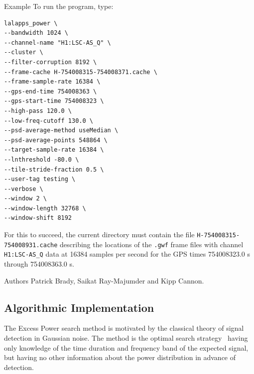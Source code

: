 \begin{entry}
\item[Example]
To run the program, type:
\begin{verbatim}
lalapps_power \
--bandwidth 1024 \
--channel-name "H1:LSC-AS_Q" \
--cluster \
--filter-corruption 8192 \
--frame-cache H-754008315-754008371.cache \
--frame-sample-rate 16384 \
--gps-end-time 754008363 \
--gps-start-time 754008323 \
--high-pass 120.0 \
--low-freq-cutoff 130.0 \
--psd-average-method useMedian \
--psd-average-points 548864 \
--target-sample-rate 16384 \
--lnthreshold -80.0 \
--tile-stride-fraction 0.5 \
--user-tag testing \
--verbose \
--window 2 \
--window-length 32768 \
--window-shift 8192
\end{verbatim}
For this to succeed, the current directory must contain the file
\texttt{H-754008315-754008931.cache} describing the locations of the
\texttt{.gwf} frame files with channel \verb|H1:LSC-AS_Q| data at 16384
samples per second for the GPS times 754008323.0 s through 754008363.0 s.

\item[Authors]
Patrick Brady, Saikat Ray-Majumder and Kipp Cannon.  
\end{entry}
\clearpage

\subsection{Algorithmic Implementation}

The Excess Power search method is motivated by the classical theory of
signal detection in Gaussian noise.  The method is the optimal search
strategy~\cite{Anderson:2000yy} having only knowledge of the time duration
and frequency band of the expected signal,  but having no other
information about the power distribution in advance of detection. 

